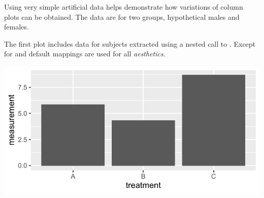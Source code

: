 \documentclass[krantz2]{krantz}\usepackage{knitr}
\begin{document}
Using very simple artificial data helps demonstrate how variations of column plots can be obtained. The data are for two groups, hypothetical males and females.

\begin{knitrout}\footnotesize
{}\color{fgcolor}\begin{kframe}
\begin{alltt}
\hlstd{(}\hlstd{)}
 \hlkwb{<-}
  \hlstd{(} \hlstd{=} \hlstd{(}\hlstd{(}\hlstd{(}\hlstd{,} \hlstd{,} \hlstd{),} \hlstd{)),}
              \hlstd{=} \hlstd{(}\hlstd{(}\hlstd{(}\hlstd{,} \hlstd{),} \hlstd{(}\hlstd{,} \hlstd{))),}
              \hlstd{=} \hlstd{(}\hlstd{)} \hlopt{+} \hlstd{(}\hlstd{,} \hlstd{,} \hlstd{))}
\end{alltt}
\end{kframe}
\end{knitrout}

The first plot includes data for  subjects extracted using a nested call to . Except for  and  default mappings are used for all \emph{aesthetics}.



\begin{knitrout}\footnotesize
{}\color{fgcolor}\begin{kframe}
\begin{alltt}
\hlstd{(} \hlopt{==} \hlstd{),}
        \hlstd{=} \hlstd{(}    \hlopt{+}
  \hlstd{()}
\end{alltt}
\end{kframe}

{\centering \includegraphics[width=.495\textwidth]{figure/pos-col-plot-02-1} 

}


\end{knitrout}
\end{document}
